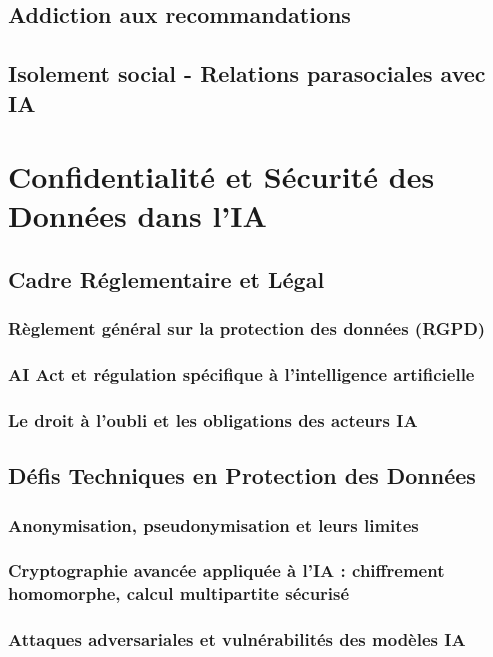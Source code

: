 \documentclass[12pt,a4paper]{book}
\begin{document}
\section{Addiction aux recommandations}
\section{Isolement social - Relations parasociales avec IA}

\chapter{Confidentialité et Sécurité des Données dans l’IA}

\section{Cadre Réglementaire et Légal}
\subsection{Règlement général sur la protection des données (RGPD)}
\subsection{AI Act et régulation spécifique à l’intelligence artificielle}
\subsection{Le droit à l’oubli et les obligations des acteurs IA}

\section{Défis Techniques en Protection des Données}
\subsection{Anonymisation, pseudonymisation et leurs limites}
\subsection{Cryptographie avancée appliquée à l’IA : chiffrement homomorphe, calcul multipartite sécurisé}
\subsection{Attaques adversariales et vulnérabilités des modèles IA}
\end{document}
